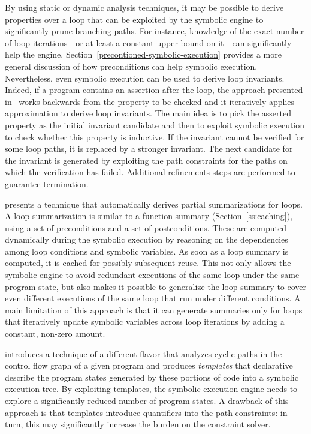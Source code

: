 By using static or dynamic analysis techniques, it may be possible to derive properties over a loop that can be exploited by the symbolic engine to significantly prune branching paths. For instance, knowledge of the exact number of loop iterations - or at least a constant upper bound on it - can significantly help the engine. Section~\ref{precontioned-symbolic-execution} provides a more general discussion of how preconditions can help symbolic execution. Nevertheless, even symbolic execution can be used to derive loop invariants. Indeed, if a program contains an assertion after the loop, the approach presented in~\cite{PV-SPIN04} works backwards from the property to be checked and it iteratively applies approximation to derive loop invariants. The main idea is to pick the asserted property as the initial invariant candidate and then to exploit symbolic execution to check whether this property is inductive. If the invariant cannot be verified for some loop paths, it is replaced by a stronger invariant. The next candidate for the invariant is generated by exploiting the path constraints for the paths on which the verification has failed. Additional refinements steps are performed to guarantee termination.


\cite{GL-ISSTA11} presents a technique that automatically derives partial summarizations for loops. A loop summarization is similar to a function summary (Section~\ref{ss:caching}), using a set of preconditions and a set of postconditions. These are computed dynamically during the symbolic execution by reasoning on the dependencies among loop conditions and symbolic variables. As soon as a loop summary is computed, it is cached for possibly subsequent reuse. This not only allows the symbolic engine to avoid redundant executions of the same loop under the same program state, but also makes it possible to generalize the loop summary to cover even different executions of the same loop that run under different conditions. A main limitation of this approach is that it can generate summaries only for loops that iteratively update symbolic variables across loop iterations by adding a constant, non-zero amount.

\cite{SST-ATVA13} introduces a technique of a different flavor that analyzes cyclic paths in the control flow graph of a given program and produces {\em templates} that declarative describe the program states generated by these portions of code into a symbolic execution tree. By exploiting templates, the symbolic execution engine needs to explore a significantly reduced number of program states. A drawback of this approach is that templates introduce quantifiers into the path constraints: in turn, this may significantly increase the burden on the constraint solver.



